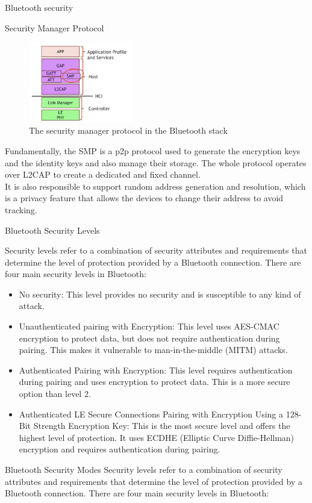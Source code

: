 \begin{section}{Bluetooth security}
\begin{subsection}{Security Manager Protocol}
    \begin{figure}[H]
      \centering
      \includegraphics[width=0.4\textwidth]{img/wireless/security manager protocol.png}
      \caption{The security manager protocol in the Bluetooth stack}
    \end{figure}
    Fundamentally, the SMP is a p2p protocol used to generate the encryption keys and the identity
    keys and also manage their storage. The whole protocol operates over L2CAP to create a dedicated
    and fixed channel.\\
    It is also responsible to support random address generation and resolution, which is a privacy
    feature that allows the devices to change their address to avoid tracking.

  \end{subsection}
  \begin{subsection}{Bluetooth Security Levels}

    Security levels refer to a combination of security attributes and requirements that determine
    the level of protection provided by a Bluetooth connection. There are four main security levels
    in Bluetooth:

    \begin{itemize}
      \item No security: This level provides no security and is susceptible to any kind of attack.
      \item Unauthenticated pairing with Encryption: This level uses AES-CMAC encryption to protect
        data, but does not require authentication during pairing. This makes it vulnerable to
        man-in-the-middle (MITM) attacks.
      \item Authenticated Pairing with Encryption: This level requires authentication during pairing
        and uses encryption to protect data. This is a more secure option than level 2.
      \item Authenticated LE Secure Connections Pairing with Encryption Using a 128-Bit Strength
        Encryption Key: This is the most secure level and offers the highest level of protection. It
        uses ECDHE (Elliptic Curve Diffie-Hellman) encryption and requires authentication during
        pairing.
    \end{itemize}
  \end{subsection}
  \begin{subsection}{Bluetooth Security Modes}
    Security levels refer to a combination of security attributes and requirements that determine the level of protection provided by a Bluetooth connection. There are four main security levels in Bluetooth:


\end{subsection}
\end{section}
